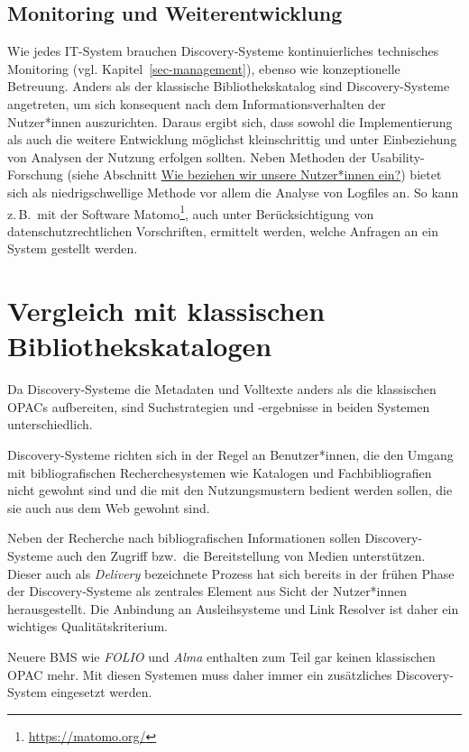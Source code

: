 \documentclass[
  11pt,
  letterpaper,
  DIV=11,
  twoside]{scrreprt}
\DeclareRobustCommand{\href}[2]{#2\footnote{\url{#1}}}
\begin{document}
\subsection{Monitoring und
Weiterentwicklung}\label{monitoring-und-weiterentwicklung}

Wie jedes IT-System brauchen Discovery-Systeme kontinuierliches
technisches Monitoring (vgl. Kapitel~\ref{sec-management}), ebenso wie
konzeptionelle Betreuung. Anders als der klassische Bibliothekskatalog
sind Discovery-Systeme angetreten, um sich konsequent nach dem
Informationsverhalten der Nutzer*innen auszurichten. Daraus ergibt sich,
dass sowohl die Implementierung als auch die weitere Entwicklung
möglichst kleinschrittig und unter Einbeziehung von Analysen der Nutzung
erfolgen sollten. Neben Methoden der Usability-Forschung (siehe
Abschnitt \hyperref[einbeziehung]{Wie beziehen wir unsere Nutzer*innen
ein?}) bietet sich als niedrigschwellige Methode vor allem die Analyse
von Logfiles an. So kann z.\,B.~mit der Software
\href{https://matomo.org/}{Matomo}, auch unter Berücksichtigung von
datenschutzrechtlichen Vorschriften, ermittelt werden, welche Anfragen
an ein System gestellt werden.

\section{Vergleich mit klassischen
Bibliothekskatalogen}\label{vergleich-mit-klassischen-bibliothekskatalogen}

Da Discovery-Systeme die Metadaten und Volltexte anders als die
klassischen OPACs aufbereiten, sind Suchstrategien und -ergebnisse in
beiden Systemen unterschiedlich.

Discovery-Systeme richten sich in der Regel an Benutzer*innen, die den
Umgang mit bibliografischen Recherchesystemen wie Katalogen und
Fachbibliografien nicht gewohnt sind und die mit den Nutzungsmustern
bedient werden sollen, die sie auch aus dem Web gewohnt sind.

Neben der Recherche nach bibliografischen Informationen sollen
Discovery-Systeme auch den Zugriff bzw.~die Bereitstellung von Medien
unterstützen. Dieser auch als \emph{Delivery} bezeichnete Prozess hat
sich bereits in der frühen Phase der Discovery-Systeme als zentrales
Element aus Sicht der Nutzer*innen herausgestellt. Die Anbindung an
Ausleihsysteme und Link Resolver ist daher ein wichtiges
Qualitätskriterium.

Neuere BMS wie \emph{FOLIO} und \emph{Alma} enthalten zum Teil gar
keinen klassischen OPAC mehr. Mit diesen Systemen muss daher immer ein
zusätzliches Discovery-System eingesetzt werden.
\end{document}
